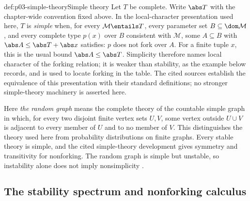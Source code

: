 \begin{hbdefinition}{def:p03-simple-theory}{Simple theory}
Let \(T\) be complete.  Write
\(\abs T\) with the chapter-wide convention fixed above.
In the local-character presentation used here, \(T\) is \emph{simple} when,
for every \(\mathcal M\entails T\), every parameter set
\(B\subseteq\dom\mathcal M\), and every complete type \(p(x)\) over \(B\)
consistent with \(\mathcal M\), some \(A\subseteq B\) with
\(\abs A\leq\abs T+\abs x\) satisfies: \(p\) does not fork over \(A\).
For a finite tuple \(x\), this is the usual bound
\(\abs A\leq\abs T\).  Simplicity therefore names local character of the
forking relation; it is weaker than stability, as the example below records,
and is used to locate forking in the table.  The cited sources establish the
equivalence of this presentation with their standard definitions; no stronger
simple-theory machinery is asserted here.
\end{hbdefinition}

Here \emph{the random graph} means the complete theory of the countable simple
graph in which, for every two disjoint finite vertex sets \(U,V\), some vertex
outside \(U\cup V\) is adjacent to every member of \(U\) and to no member of
\(V\).  This distinguishes the theory used here from probability distributions
on finite graphs.
Every stable theory is simple, and the cited simple-theory development gives
symmetry and transitivity for nonforking.  The random graph is simple but
unstable, so instability alone does not imply nonsimplicity
\cite{Shelah1971Stability,TentZiegler2012,Kim1998}.

\subsection{The stability spectrum and nonforking calculus}

